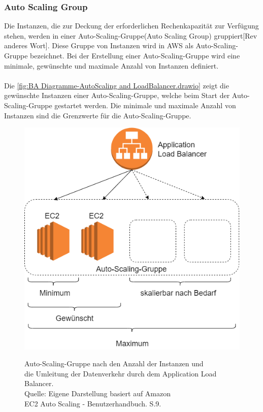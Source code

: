 \subsubsection*{Auto Scaling Group}
Die Instanzen, die zur Deckung der erforderlichen Rechenkapazität zur Verfügung stehen, werden in einer Auto-Scaling-Gruppe(Auto Scaling Group) gruppiert[Rev anderes Wort]. Diese Gruppe von Instanzen wird in AWS als Auto-Scaling-Gruppe bezeichnet. Bei der Erstellung einer Auto-Scaling-Gruppe wird eine minimale, gewünschte und maximale Anzahl von Instanzen definiert. 
\\\\
Die \autoref{fig:BA Diagramme-AutoScaling and LoadBalancer.drawio} zeigt die gewünschte Instanzen einer Auto-Scaling-Gruppe, welche beim Start der Auto-Scaling-Gruppe gestartet werden. Die minimale und maximale Anzahl von Instanzen sind die Grenzwerte für die Auto-Scaling-Gruppe.  
\begin{figure}[h]
  \centering
  \includegraphics[scale=0.5]{sources/BA Diagramme-AutoScaling and LoadBalancer.drawio}
  \caption[Auto-Scaling-Gruppe nach den Anzahl der Instanzen und Umleitung der Datenverkehr durch dem Application Load Balancer]{}
  \label{fig:BA Diagramme-AutoScaling and LoadBalancer.drawio} 
  Auto-Scaling-Gruppe nach den Anzahl der Instanzen und\\ die Umleitung der Datenverkehr durch dem Application Load Balancer.\\
  Quelle: Eigene Darstellung %
  basiert auf Amazon \\
  EC2 Auto Scaling - Benutzerhandbuch. S.9\cite{AMZ31}.
\end{figure}
\\\\
